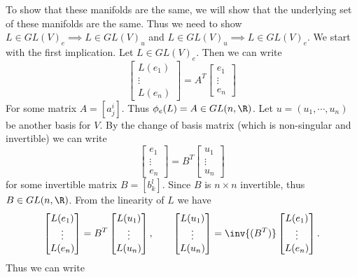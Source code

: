 \begin{solution}
	To show that these manifolds are the same, we will show that the underlying set of these manifolds are the same. Thus we need to show $ L \in GL(V)_e \implies L\in GL(V)_u $ and $ L \in GL(V)_u  \implies L \in GL(V)_e $. We start with the first implication. Let $ L \in GL(V)_e $. Then we can write
	\[ 
	\begin{bmatrix}
		L(e_1) \\
		\vdots \\
		L(e_n)
	\end{bmatrix}
	= A^T
	\begin{bmatrix}
		e_1 \\
		\vdots \\
		e_n
	\end{bmatrix}
	 \]
	For some matrix $ A = [a^i_j] $. Thus $ \phi_e(L) = A \in GL(n,\R) $. Let $ u = (u_1,\cdots,u_n) $ be another basis for $ V $. By the change of basis matrix (which is non-singular and invertible) we can write
	\[ 
	\begin{bmatrix}
	 	e_1 \\
	 	\vdots \\
	 	e_n
	\end{bmatrix}
	= B^T
	\begin{bmatrix}
	 	u_1 \\
	 	\vdots \\
	u_n
	\end{bmatrix}
	\]
	for some invertible matrix $ B = [b^l_k] $. Since $ B $ is $ n\times n $ invertible, thus $ B \in GL(n,\R) $. From the linearity of $ L $ we have
	\[ 
	\begin{bmatrix}
	  	L(e_1) \\
	  	\vdots \\
	  	L(e_n)
	\end{bmatrix}
	= B^T
	\begin{bmatrix}
	  	L(u_1) \\
	  	\vdots \\
	  	L(u_n)
	\end{bmatrix}, \qquad
	\begin{bmatrix}
		L(u_1) \\
		\vdots \\
		L(u_n)
	\end{bmatrix}
	= \inv{(B^T)}
	\begin{bmatrix}
		L(e_1) \\
		\vdots \\
		L(e_n)
	\end{bmatrix}.
	\]
	Thus we can write

\end{solution}
